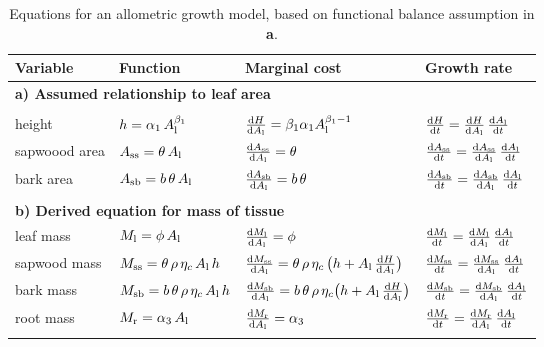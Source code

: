 \documentclass[a4paper,11pt]{article}
\begin{document}
\begin{table}[ht]
\caption{Equations for an allometric growth model, based on functional balance assumption in {\textbf a}. }
\centering

{\footnotesize  %
 \begin{doublespace}
  \begin{tabular}{p{2.5cm}p{3.5cm}p{5cm}p{4cm} }\\ \hline
  Variable & Function & Marginal cost & Growth rate\\ \hline
  \multicolumn{4}{l}{\textbf{a) Assumed relationship to leaf area}} \\ \\
  height &
    $h = \alpha_1 \, A_{\rm l}^{\beta_1}$ &
    $\frac{{\rm d}H}{{\rm d}A_{\rm l}} =  \beta_1 \alpha_1 A_{\rm l}^{\beta_1-1}$ &
    $\frac{{\rm d}H}{{\rm d}t}  = \frac{{\rm d}H}{{\rm d}A_{\rm l}} \, \frac{{\rm d}A_{\rm l}}{{\rm d}t}$ \\
  sapwoood area &
    $A_\textrm{ss} = \theta \, A_{\rm l}$ &
    $\frac{{\rm d}A_\textrm{ss}}{{\rm d} A_{\rm l}} = \theta$ &
    $\frac{{\rm d}A_\textrm{ss}}{{\rm d}t}  =\frac{{\rm d}A_\textrm{ss}}{{\rm d} A_{\rm l}} \, \frac{{\rm d}A_{\rm l}}{{\rm d}t}$ \\
  bark area &
    $A_{\rm sb} = b \, \theta \, A_{\rm l}$ &
    $\frac{{\rm d}A_{\rm sb}}{{\rm d} A_{\rm l}} = b \, \theta$ &
    $\frac{{\rm d}A_{\rm sb}}{{\rm d}t} = \frac{{\rm d}A_{\rm sb}}{{\rm d} A_{\rm l}} \, \frac{{\rm d}A_{\rm l}}{{\rm d}t}$ \\  \\
  \multicolumn{4}{l}{\textbf{b) Derived equation for mass of tissue }} \\
  leaf mass &
    $M_{\rm l} = \phi \, A_{\rm l} $ &
    $\frac{{\rm d}M_{\rm l}}{{\rm d}A_{\rm l}} = \phi$ &
    $\frac{{\rm d}M_{\rm l}}{{\rm d}t}  = \frac{{\rm d}M_{\rm l}}{{\rm d}A_{\rm l}}  \, \frac{{\rm d}A_{\rm l}}{{\rm d}t}$ \\
  sapwood mass &
    $M_\textrm{ss} = \theta \, \rho \, \eta_c \, A_{\rm l} \, h $ &
    $\frac{{\rm d}M_\textrm{ss}}{{\rm d}A_{\rm l}} = \theta\, \rho\, \eta_c\, \big( h + A_{\rm l}\, \frac{{\rm d}H}{{\rm d}A_{\rm l}} \big)$ &
    $\frac{{\rm d}M_\textrm{ss}}{{\rm d}t}  = \frac{{\rm d}M_\textrm{ss}}{{\rm d}A_{\rm l}} \, \frac{{\rm d}A_{\rm l}}{{\rm d}t}$ \\
  bark mass &
    $M_{\rm sb} = b\, \theta \, \rho \, \eta_c \, A_{\rm l} \, h $ &
    $\frac{{\rm d}M_{\rm sb}}{{\rm d}A_{\rm l}} = b \, \theta \, \rho \, \eta_c\big( h + A_{\rm l} \, \frac{{\rm d}H}{{\rm d}A_{\rm l}} \big)$ &
    $\frac{{\rm d}M_{\rm sb}}{{\rm d}t}  = \frac{{\rm d}M_{\rm sb}}{{\rm d}A_{\rm l}} \, \frac{{\rm d}A_{\rm l}}{{\rm d}t}$ \\
  root mass &
    $M_{\rm r} = \alpha_3 \, A_{\rm l}$ &
    $\frac{{\rm d}M_{\rm r}}{{\rm d}A_{\rm l}} = \alpha_3$  &
    $\frac{{\rm d}M_{\rm r}}{{\rm d}t}  = \frac{{\rm d}M_{\rm r}}{{\rm d}A_{\rm l}}  \, \frac{{\rm d}A_{\rm l}}{{\rm d}t}$ \\ \\


\end{tabular}
\end{doublespace}}
\end{table}
\end{document}
